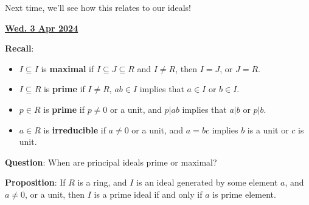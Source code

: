 \documentclass[12pt]{article}
\renewcommand{\date}[1]{\underline{\bf #1}}
\begin{document}

Next time, we'll see how this relates to our ideals!

\date{Wed. 3 Apr 2024}


{\bf Recall}: 

\begin{itemize}
  \item $I \subseteq I$ is {\bf maximal} if $I \subseteq J \subseteq R$ and $I \ne R$, then $I = J$, or $J = R$.
  \item $I \subseteq R$ is {\bf prime} if $I \ne R$, $ab \in I$ implies that $a
    \in I$ or $b \in I$.
  \item $p \in R$ is {\bf prime} if $p \ne 0$ or a unit, and $p | ab$ implies
    that $a | b$ or $p | b$.
  \item $a \in R$ is {\bf irreducible} if $a \ne 0$ or a unit, and $a = bc$
    implies $b$ is a unit or $c$ is unit.
\end{itemize}

{\bf Question}: When are principal ideals prime or maximal?

{\bf Proposition}: If $R$ is a ring, and $I$ is an ideal generated by some
element $a$, and $a \ne 0$, or a unit, then $I$ is a prime ideal if and only if
$a$ is prime element.
\end{document}

